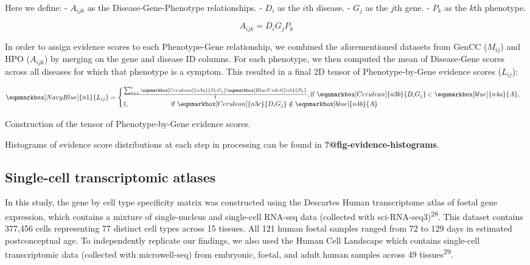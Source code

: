 \documentclass[
]{report}
\begin{document}
Here we define: - \(A_{ijk}\) as the Disease-Gene-Phenotype
relationships. - \(D_i\) as the \(i\)th disease. - \(G_j\) as the
\(j\)th gene. - \(P_k\) as the \(k\)th phenotype.

\[
A_{ijk} = D_i G_j P_k
\]

In order to assign evidence scores to each Phenotype-Gene relationship,
we combined the aforementioned datasets from GenCC (\(M_{ij}\)) and HPO
(\(A_{ijk}\)) by merging on the gene and disease ID columns. For each
phenotype, we then computed the mean of Disease-Gene scores across all
diseases for which that phenotype is a symptom. This resulted in a final
2D tensor of Phenotype-by-Gene evidence scores (\(L_{ij}\)):

\hfill\break
\hfill\break

$$
 \eqnmarkbox[NavyBlue]{n1}{ L_{ij} } = 
 \begin{cases}
  \frac{\sum_{k=1}^{\text{f}} 
    \eqnmarkbox[Cerulean]{n3a}{D_i G_j} 
    \eqnmarkbox[BlueViolet]{n5}{P_k} 
    }{\text{f}}, 
  \text{if } \eqnmarkbox[Cerulean]{n3b}{D_i G_j} 
    \in \eqnmarkbox[blue]{n4a}{A},
  \\
  1, \hspace{2.2cm}
  \text{if } \eqnmarkbox[Cerulean]{n3c}{D_i G_j} 
    \notin\eqnmarkbox[blue]{n4b}{A}
 \end{cases}
$$

\hfill\break

Construction of the tensor of Phenotype-by-Gene evidence scores.

\hfill\break

Histograms of evidence score distributions at each step in processing
can be found in \textbf{?@fig-evidence-histograms}.

\subsection{Single-cell transcriptomic
atlases}\label{single-cell-transcriptomic-atlases}

In this study, the gene by cell type specificity matrix was constructed
using the Descartes Human transcriptome atlas of foetal gene expression,
which contains a mixture of single-nucleus and single-cell RNA-seq data
(collected with sci-RNA-seq3)\textsuperscript{28}. This dataset contains
377,456 cells representing 77 distinct cell types across 15 tissues. All
121 human foetal samples ranged from 72 to 129 days in estimated
postconceptual age. To independently replicate our findings, we also
used the Human Cell Landscape which contains single-cell transcriptomic
data (collected with microwell-seq) from embryonic, foetal, and adult
human samples across 49 tissues\textsuperscript{29}.
\end{document}

